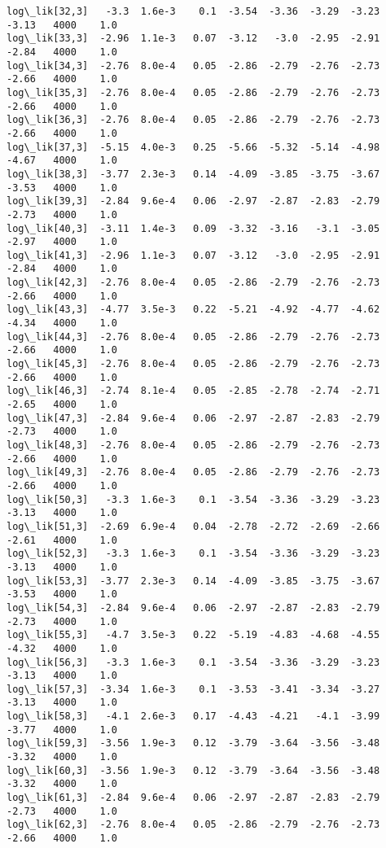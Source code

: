 \documentclass[11pt]{article}
\begin{document}
\begin{Verbatim}[commandchars=\\\{\}]
log\_lik[32,3]   -3.3  1.6e-3    0.1  -3.54  -3.36  -3.29  -3.23  -3.13   4000    1.0
log\_lik[33,3]  -2.96  1.1e-3   0.07  -3.12   -3.0  -2.95  -2.91  -2.84   4000    1.0
log\_lik[34,3]  -2.76  8.0e-4   0.05  -2.86  -2.79  -2.76  -2.73  -2.66   4000    1.0
log\_lik[35,3]  -2.76  8.0e-4   0.05  -2.86  -2.79  -2.76  -2.73  -2.66   4000    1.0
log\_lik[36,3]  -2.76  8.0e-4   0.05  -2.86  -2.79  -2.76  -2.73  -2.66   4000    1.0
log\_lik[37,3]  -5.15  4.0e-3   0.25  -5.66  -5.32  -5.14  -4.98  -4.67   4000    1.0
log\_lik[38,3]  -3.77  2.3e-3   0.14  -4.09  -3.85  -3.75  -3.67  -3.53   4000    1.0
log\_lik[39,3]  -2.84  9.6e-4   0.06  -2.97  -2.87  -2.83  -2.79  -2.73   4000    1.0
log\_lik[40,3]  -3.11  1.4e-3   0.09  -3.32  -3.16   -3.1  -3.05  -2.97   4000    1.0
log\_lik[41,3]  -2.96  1.1e-3   0.07  -3.12   -3.0  -2.95  -2.91  -2.84   4000    1.0
log\_lik[42,3]  -2.76  8.0e-4   0.05  -2.86  -2.79  -2.76  -2.73  -2.66   4000    1.0
log\_lik[43,3]  -4.77  3.5e-3   0.22  -5.21  -4.92  -4.77  -4.62  -4.34   4000    1.0
log\_lik[44,3]  -2.76  8.0e-4   0.05  -2.86  -2.79  -2.76  -2.73  -2.66   4000    1.0
log\_lik[45,3]  -2.76  8.0e-4   0.05  -2.86  -2.79  -2.76  -2.73  -2.66   4000    1.0
log\_lik[46,3]  -2.74  8.1e-4   0.05  -2.85  -2.78  -2.74  -2.71  -2.65   4000    1.0
log\_lik[47,3]  -2.84  9.6e-4   0.06  -2.97  -2.87  -2.83  -2.79  -2.73   4000    1.0
log\_lik[48,3]  -2.76  8.0e-4   0.05  -2.86  -2.79  -2.76  -2.73  -2.66   4000    1.0
log\_lik[49,3]  -2.76  8.0e-4   0.05  -2.86  -2.79  -2.76  -2.73  -2.66   4000    1.0
log\_lik[50,3]   -3.3  1.6e-3    0.1  -3.54  -3.36  -3.29  -3.23  -3.13   4000    1.0
log\_lik[51,3]  -2.69  6.9e-4   0.04  -2.78  -2.72  -2.69  -2.66  -2.61   4000    1.0
log\_lik[52,3]   -3.3  1.6e-3    0.1  -3.54  -3.36  -3.29  -3.23  -3.13   4000    1.0
log\_lik[53,3]  -3.77  2.3e-3   0.14  -4.09  -3.85  -3.75  -3.67  -3.53   4000    1.0
log\_lik[54,3]  -2.84  9.6e-4   0.06  -2.97  -2.87  -2.83  -2.79  -2.73   4000    1.0
log\_lik[55,3]   -4.7  3.5e-3   0.22  -5.19  -4.83  -4.68  -4.55  -4.32   4000    1.0
log\_lik[56,3]   -3.3  1.6e-3    0.1  -3.54  -3.36  -3.29  -3.23  -3.13   4000    1.0
log\_lik[57,3]  -3.34  1.6e-3    0.1  -3.53  -3.41  -3.34  -3.27  -3.13   4000    1.0
log\_lik[58,3]   -4.1  2.6e-3   0.17  -4.43  -4.21   -4.1  -3.99  -3.77   4000    1.0
log\_lik[59,3]  -3.56  1.9e-3   0.12  -3.79  -3.64  -3.56  -3.48  -3.32   4000    1.0
log\_lik[60,3]  -3.56  1.9e-3   0.12  -3.79  -3.64  -3.56  -3.48  -3.32   4000    1.0
log\_lik[61,3]  -2.84  9.6e-4   0.06  -2.97  -2.87  -2.83  -2.79  -2.73   4000    1.0
log\_lik[62,3]  -2.76  8.0e-4   0.05  -2.86  -2.79  -2.76  -2.73  -2.66   4000    1.0

\end{Verbatim}
\end{document}

